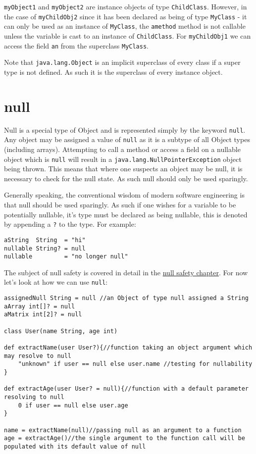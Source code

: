 \documentclass[conc-doc]{subfiles}
\begin{document}
\lstinline{myObject1} and \lstinline{myObject2} are instance objects of type \lstinline{ChildClass}. However, in the case of \lstinline{myChildObj2} since it has been declared as being of type \lstinline{MyClass} - it can only be used as an instance of \lstinline{MyClass}, the \lstinline{amethod} method is not callable unless the variable is cast to an instance of \lstinline{ChildClass}. For \lstinline{myChildObj1} we can access the field \lstinline{an} from the superclass \lstinline{MyClass}.

Note that \lstinline{java.lang.Object} is an implicit superclass of every class if a super type is not defined. As such it is the superclass of every instance object.

\section{null}
Null is a special type of Object and is represented simply by the keyword \lstinline{null}. Any object may be assigned a value of \lstinline{null} as it is a subtype of all Object types (including arrays). Attempting to call a method or access a field on a nullable object which is \lstinline{null} will result in a \lstinline{java.lang.NullPointerException} object being thrown. This means that where one suspects an object may be null, it is necessary to check for the null state. As such null should only be used sparingly.

Generally speaking, the conventional wisdom of modern software engineering is that null should be used sparingly. As such if one wishes for a variable to be potentially nullable, it's type must be declared as being nullable, this is denoted by appending a \lstinline{?} to the type. For example:

\begin{lstlisting}
aString  String  = "hi"
nullable String? = null
nullable         = "no longer null"
\end{lstlisting}

The subject of null safety is covered in detail in the \hyperref[ch:nullsafe]{null safety chapter}. For now let's look at how we can use \lstinline{null}:

\begin{lstlisting}
assignedNull String = null //an Object of type null assigned a String
aArray int[]? = null
aMatrix int[2]? = null

class User(name String, age int)

def extractName(user User?){//function taking an object argument which may resolve to null
	"unknown" if user == null else user.name //testing for nullability
}

def extractAge(user User? = null){//function with a default parameter resolving to null
	0 if user == null else user.age
}

name = extractName(null)//passing null as an argument to a function
age = extractAge()//the single argument to the function call will be populated with its default value of null
\end{lstlisting}
\end{document}
